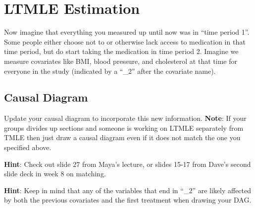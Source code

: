 \documentclass[
]{article}
\begin{document}
\hypertarget{ltmle-estimation}{%
\section{LTMLE Estimation}\label{ltmle-estimation}}

Now imagine that everything you measured up until now was in ``time
period 1''. Some people either choose not to or otherwise lack access to
medication in that time period, but do start taking the medication in
time period 2. Imagine we measure covariates like BMI, blood pressure,
and cholesterol at that time for everyone in the study (indicated by a
``\_2'' after the covariate name).

\hypertarget{causal-diagram-1}{%
\subsection{Causal Diagram}\label{causal-diagram-1}}

Update your causal diagram to incorporate this new information.
\textbf{Note}: If your groups divides up sections and someone is working
on LTMLE separately from TMLE then just draw a causal diagram even if it
does not match the one you specified above.

\textbf{Hint}: Check out slide 27 from Maya's lecture, or slides 15-17
from Dave's second slide deck in week 8 on matching.

\textbf{Hint}: Keep in mind that any of the variables that end in
``\_2'' are likely affected by both the previous covariates and the
first treatment when drawing your DAG.
\end{document}
